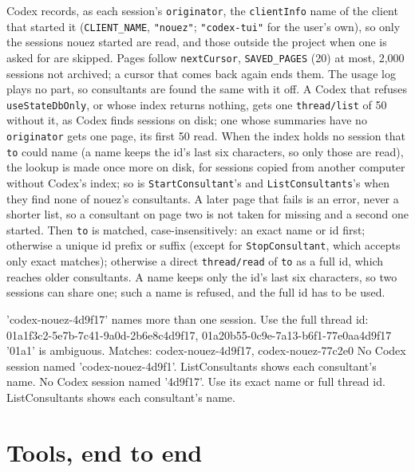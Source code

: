 \documentclass[10pt,a4paper]{article}
\newcommand{\code}[1]{\texttt{#1}}
\begin{document}
Codex records, as each session's \code{originator}, the \code{clientInfo} name of the client that
started it (\code{CLIENT\_NAME}, \code{"nouez"}; \code{"codex-tui"} for the user's own), so only
the sessions nouez started are read, and those outside the project when one is asked for are
skipped. Pages follow \code{nextCursor}, \code{SAVED\_PAGES} (20) at most, 2,000 sessions not
archived; a cursor that comes back again ends them. The usage log plays no part, so consultants are
found the same with it off. A Codex that refuses \code{useStateDbOnly}, or whose index returns
nothing, gets one \code{thread/list} of 50 without it, as Codex finds sessions on disk; one whose
summaries have no \code{originator} gets one page, its first 50 read. When the index holds no
session that \code{to} could name (a name keeps the id's last six characters, so only those are
read), the lookup is made once more on disk, for sessions copied from another computer without
Codex's index; so is \code{StartConsultant}'s and \code{ListConsultants}'s when they find none of
nouez's consultants. A later page that fails is an error, never a shorter list, so a consultant on
page two is not taken for missing and a second one started. Then \code{to} is matched, case-insensitively: an exact name or id first; otherwise a
unique id prefix or suffix (except for \code{StopConsultant}, which accepts only exact matches);
otherwise a direct \code{thread/read} of \code{to} as a full id, which reaches older consultants.
A name keeps only the id's last six characters, so two sessions can share one; such a name is
refused, and the full id has to be used.

\begin{plain}
'codex-nouez-4d9f17' names more than one session. Use the full thread id: 01a1f3c2-5e7b-7c41-9a0d-2b6e8c4d9f17, 01a20b55-0c9e-7a13-b6f1-77e0aa4d9f17
'01a1' is ambiguous. Matches: codex-nouez-4d9f17, codex-nouez-77c2e0
No Codex session named 'codex-nouez-4d9f1'. ListConsultants shows each consultant's name.
No Codex session named '4d9f17'. Use its exact name or full thread id. ListConsultants shows each consultant's name.
\end{plain}

\section{Tools, end to end}
\label{sec:tools}
\end{document}
